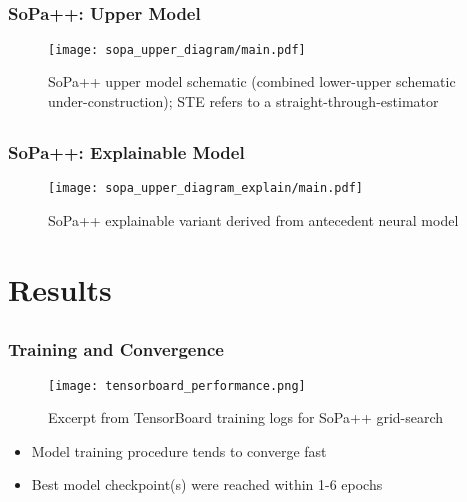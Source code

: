 \documentclass[10pt]{beamer}
\let\oldcitep=\citep
\renewcommand\citep[1]{{\textcolor{blue}{\oldcitep{#1}}}}
\begin{document}
  \subsection{}
	\begin{frame}
		\frametitle{SoPa++: Upper Model}
    \begin{figure}				       
			\captionsetup{justification=centering}
      \texttt{[image: sopa\_upper\_diagram/main.pdf]}
      \caption{SoPa++ upper model schematic (combined lower-upper schematic under-construction); STE refers to a straight-through-estimator \citep{yin2019understanding}}
    \end{figure}
	\end{frame}

  \subsection{}
	\begin{frame}
		\frametitle{SoPa++: Explainable Model}
    \begin{figure}				       
			\captionsetup{justification=centering}
      \texttt{[image: sopa\_upper\_diagram\_explain/main.pdf]}
      \caption{SoPa++ explainable variant derived from antecedent neural model}
    \end{figure}
	\end{frame} 

  \section{Results}
  \subsection{}
  \begin{frame}
		\frametitle{Training and Convergence}
    \begin{figure}				       
			\captionsetup{justification=centering}
      \texttt{[image: tensorboard\_performance.png]}
      \caption{Excerpt from TensorBoard training logs for SoPa++ grid-search}
    \end{figure}
    \begin{itemize}
      \item Model training procedure tends to converge fast
      \item Best model checkpoint(s) were reached within 1-6 epochs
    \end{itemize} 
	\end{frame} 
\end{document}
